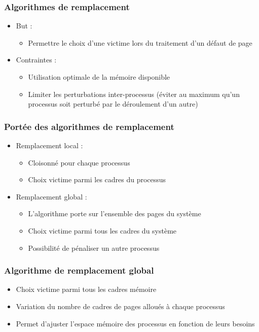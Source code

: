 \begin{frame}
\frametitle{Algorithmes de remplacement}
\begin{itemize}
\item But :
\begin{itemize}
\item Permettre le choix d'une victime lors du traitement d'un défaut de page
\end{itemize}
\item Contraintes :
\begin{itemize}
\item Utilisation optimale de la mémoire disponible
\item Limiter les perturbations inter-processus (éviter au maximum qu'un processus soit perturbé par le déroulement d'un autre)
\end{itemize}
\end{itemize}
\end{frame}


\begin{frame}
\frametitle{Portée des algorithmes de remplacement}
\begin{itemize}
\item Remplacement local :
\begin{itemize}
\item Cloisonné pour chaque processus
\item Choix victime parmi les cadres du processus
\end{itemize}
\item Remplacement global :
\begin{itemize}
\item L'algorithme porte sur l'ensemble des pages du système
\item Choix victime parmi tous les cadres du système
\item Possibilité de pénaliser un autre processus
\end{itemize}
\end{itemize}
\end{frame}


\begin{frame}
\frametitle{Algorithme de remplacement global}
\begin{itemize}
\item Choix victime parmi tous les cadres mémoire
\item Variation du nombre de cadres de pages alloués à chaque processus
\item Permet d'ajuster l'espace mémoire des processus en fonction de leurs besoins
\end{itemize}
\end{frame}


